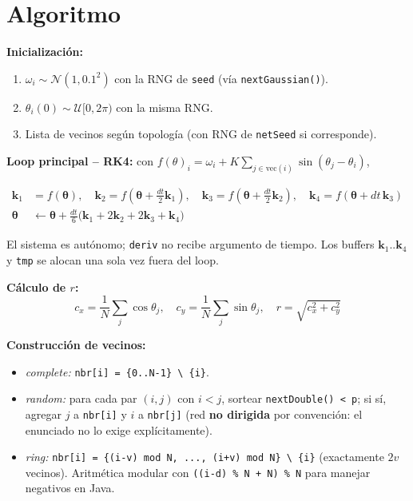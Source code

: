 \documentclass[11pt,a4paper]{article}
\begin{document}
\section{Algoritmo}

\textbf{Inicialización:}
\begin{enumerate}
\item $\omega_i \sim \mathcal{N}(1, 0.1^2)$ con la RNG de \texttt{seed} (vía \texttt{nextGaussian()}).
\item $\theta_i(0) \sim \mathcal{U}[0, 2\pi)$ con la misma RNG.
\item Lista de vecinos según topología (con RNG de \texttt{netSeed} si corresponde).
\end{enumerate}

\textbf{Loop principal -- RK4:} con $f(\theta)_i = \omega_i + K \sum_{j\in\text{vec}(i)} \sin(\theta_j-\theta_i)$,

\begin{align*}
\mathbf k_1 &= f(\boldsymbol\theta), \quad \mathbf k_2 = f(\boldsymbol\theta + \tfrac{dt}{2}\mathbf k_1), \quad \mathbf k_3 = f(\boldsymbol\theta + \tfrac{dt}{2}\mathbf k_2), \quad \mathbf k_4 = f(\boldsymbol\theta + dt\,\mathbf k_3) \\
\boldsymbol\theta &\leftarrow \boldsymbol\theta + \tfrac{dt}{6}\bigl(\mathbf k_1 + 2\mathbf k_2 + 2\mathbf k_3 + \mathbf k_4\bigr)
\end{align*}

El sistema es autónomo; \texttt{deriv} no recibe argumento de tiempo. Los buffers $\mathbf k_1..\mathbf k_4$ y \texttt{tmp} se alocan una sola vez fuera del loop.

\textbf{Cálculo de $r$:}
\[
c_x = \frac{1}{N}\sum_j \cos\theta_j, \quad c_y = \frac{1}{N}\sum_j \sin\theta_j, \quad r = \sqrt{c_x^2 + c_y^2}
\]

\textbf{Construcción de vecinos:}
\begin{itemize}
\item \emph{complete:} \texttt{nbr[i] = \{0..N-1\} \textbackslash\ \{i\}}.
\item \emph{random:} para cada par $(i,j)$ con $i<j$, sortear \texttt{nextDouble() < p}; si sí, agregar $j$ a \texttt{nbr[i]} y $i$ a \texttt{nbr[j]} (red \textbf{no dirigida} por convención: el enunciado no lo exige explícitamente).
\item \emph{ring:} \texttt{nbr[i] = \{(i-v) mod N, ..., (i+v) mod N\} \textbackslash\ \{i\}} (exactamente $2v$ vecinos). Aritmética modular con \texttt{((i-d) \% N + N) \% N} para manejar negativos en Java.
\end{itemize}
\end{document}
